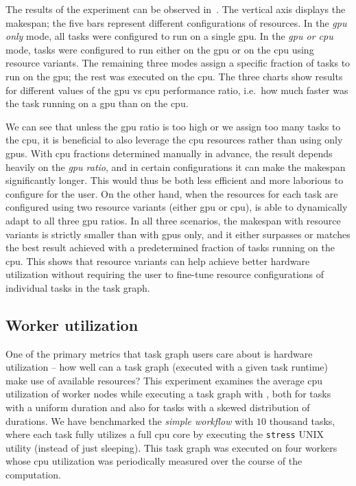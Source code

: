 \vspace{1mm}The results of the experiment can be observed in~.
The vertical axis displays the makespan; the five bars represent different configurations of resources. In the
\emph{\gls{gpu} only} mode, all tasks were configured to run on a single
\gls{gpu}. In the \emph{\gls{gpu} or \gls{cpu}} mode, tasks were configured to run either
on the \gls{gpu} or on the \gls{cpu} using resource variants. The
remaining three modes assign a specific fraction of tasks to run on the \gls{gpu};
the rest was executed on the \gls{cpu}. The three charts show results for different
values of the \gls{gpu} vs \gls{cpu} performance ratio, i.e.\ how much
faster was the task running on a \gls{gpu} than on the \gls{cpu}.

We can see that unless the \gls{gpu} ratio is too high or we assign too many tasks to
the \gls{cpu}, it is beneficial to also leverage the \gls{cpu}
resources rather than using only \glspl{gpu}. With \gls{cpu} fractions
determined manually in advance, the result depends heavily on the \emph{\gls{gpu} ratio}, and in
certain configurations it can make the makespan significantly longer. This would thus be both less
efficient and more laborious to configure for the user. On the other hand, when the resources for
each task are configured using two resource variants (either \gls{gpu} or
\gls{cpu}), \hyperqueue{} is able to dynamically adapt to all three
\gls{gpu} ratios. In all three scenarios, the makespan with resource variants is
strictly smaller than with \glspl{gpu} only, and it either surpasses or matches the
best result achieved with a predetermined fraction of tasks running on the \gls{cpu}.
This shows that resource variants can help achieve better hardware utilization without requiring
the user to fine-tune resource configurations of individual tasks in the task graph.

\subsection{Worker  utilization}
\label{sec:hq-cpu-utilization}
One of the primary metrics that task graph users care about is hardware utilization -- how well can
a task graph (executed with a given task runtime) make use of available resources? This experiment
examines the average \gls{cpu} utilization of worker nodes while executing a task
graph with \hyperqueue{}, both for tasks with a uniform duration and also for tasks with
a skewed distribution of durations. We have benchmarked the \emph{simple workflow} with
$10$ thousand tasks, where each task fully utilizes a full
\gls{cpu} core by executing the \texttt{stress} UNIX utility (instead of just
sleeping). This task graph was executed on four workers whose
\gls{cpu} utilization was periodically measured over the course of the computation.

